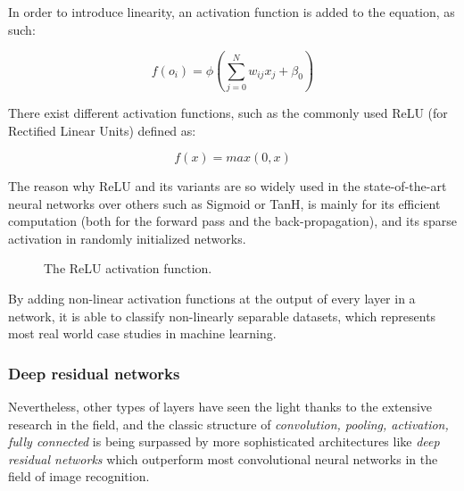 In order to introduce linearity, an activation function is added to the
equation, as such:

\begin{equation} \label{nonlinear_perceptron}
	f(o_i) = \phi(\displaystyle\sum_{j=0}^{N} w_{ij}x_j+\beta_0)
\end{equation}

There exist different activation functions, such as the commonly used ReLU (for
Rectified Linear Units) defined as:

\begin{equation} \label{relu}
	f(x) = max(0, x)
\end{equation}

The reason why ReLU and its variants are so widely used in the state-of-the-art
neural networks over others such as Sigmoid or TanH, is mainly for its
efficient computation (both for the forward pass and the back-propagation), and
its sparse activation in randomly initialized networks.

\begin{figure}[h]
	\centering
	\caption{The ReLU activation function.}
\end{figure}

By adding non-linear activation functions at the output of every layer in a
network, it is able to classify non-linearly separable datasets, which
represents most real world case studies in machine learning.\\


\subsubsection{Deep residual networks}

Nevertheless, other types of layers have seen the light thanks to the extensive
research in the field, and the classic structure of \emph{convolution, pooling,
activation, fully connected} is being surpassed by more sophisticated
architectures like \emph{deep residual networks} which outperform most
convolutional neural networks in the field of image recognition.\\

